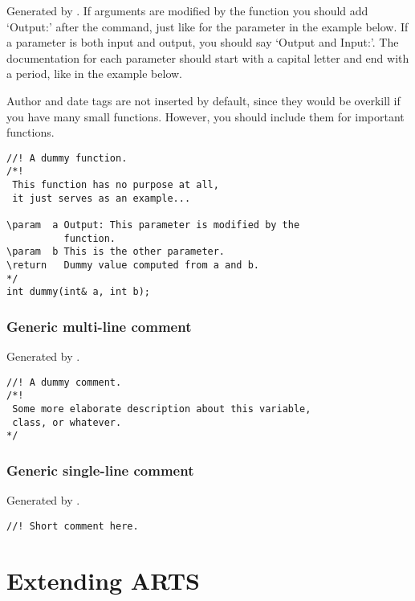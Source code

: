 Generated by .
If arguments are modified by the function you should
add `Output:' after the \artsstyle{\\param} command, just like for the
parameter  in the example below. If a parameter is both input
and output, you should say `Output and Input:'. The documentation for
each parameter should start with a capital letter and end with a
period, like in the example below.

Author and date tags are not inserted by default, since they would be
overkill if you have many small functions. However, you should include
them for important functions. 

\begin{verbatim}
//! A dummy function.
/*! 
 This function has no purpose at all,
 it just serves as an example... 

\param  a Output: This parameter is modified by the
          function.
\param  b This is the other parameter.         
\return   Dummy value computed from a and b.         
*/
int dummy(int& a, int b);
\end{verbatim}

\subsubsection{Generic multi-line comment}

Generated by .

\begin{verbatim}
//! A dummy comment.
/*! 
 Some more elaborate description about this variable, 
 class, or whatever. 
*/
\end{verbatim}

\subsubsection{Generic single-line comment}

Generated by .

\begin{verbatim}
//! Short comment here.
\end{verbatim}


\section{Extending ARTS}
 \label{sec:development:extending}

